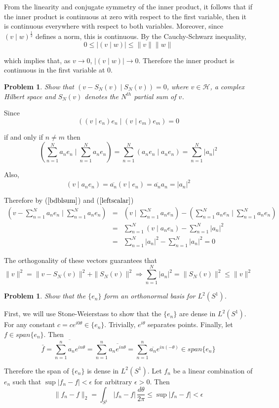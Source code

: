 \documentclass[letterpaper,11pt]{article}
\newtheorem{problem}[theorem]{Problem}
\newcommand{\ip}[2]{\left(#1\mid#2\right)}
\begin{document}
From the linearity and conjugate symmetry of the inner product, it follows that if the inner product is continuous at zero with respect to the first variable, then it is continuous everywhere with respect to both variables.  Moreover, since $\ip{v}{w}^{\frac{1}{2}}$ defines a norm, this is continuous.  By the Cauchy-Schwarz inequality,
\[
0 \leq |\ip{v}{w}| \leq \|v\|\|w\|
\]

which implies that, as $v \rightarrow 0$, $|\ip{v}{w}| \rightarrow 0$.  Therefore the inner product is continuous in the first variable at $0$.

\begin{problem}
Show that $\ip{v - S_N(v)}{S_N(v)} = 0$, where $v \in \mathcal{H}$, a complex Hilbert space and $S_N(v)$ denotes the $N^{th}$ partial sum of $v$.
\end{problem}

Since
\[
\ip{\ip{v}{e_n} e_n}{\ip{v}{e_m} e_m} = 0
\]

if and only if $n \neq m$ then
\begin{equation}
\label{bdblsum}
\ip{\sum_{n=1}^N a_n e_n}{\sum_{n=1}^N a_n e_n} = \sum_{n=1}^N \ip{a_n e_n}{a_n e_n} = \sum_{n=1}^N |a_n|^2
\end{equation}

Also,
\begin{equation}
\label{leftscalar}
\ip{v}{a_n e_n} = \overline{a_n} \ip{v}{e_n} = \overline{a_n} a_n = |a_n|^2
\end{equation}

Therefore by ($\ref{bdblsum}$) and ($\ref{leftscalar}$)
\begin{eqnarray*}
\ip{v - \sum_{n=1}^N a_n e_n}{\sum_{n=1}^N a_n e_n} &=& \ip{v}{\sum_{n=1}^N a_n e_n} - \ip{\sum_{n=1}^N a_n e_n}{\sum_{n=1}^N a_n e_n} \\
&=& \sum_{n=1}^N \ip{v}{a_n e_n} - \sum_{n=1}^N |a_n|^2 \\
&=& \sum_{n=1}^N |a_n|^2 - \sum_{n=1}^N |a_n|^2 = 0
\end{eqnarray*}

The orthogonality of these vectors guarantees that
\[
\|v\|^2 = \|v - S_N(v)\|^2 + \|S_N(v)\|^2 \Rightarrow \sum_{n=1}^N |a_n|^2 = \|S_N(v)\|^2  \leq \|v\|^2
\]

\begin{problem}
Show that the $\{e_n\}$ form an orthonormal basis for $L^2(S^1)$.
\end{problem}

First, we will use Stone-Weierstass to show that the $\{e_n\}$ are dense in $L^2(S^1)$.  For any constant $c = ce^{i0\theta} \in \{e_n\}$.  Trivially, $e^{i\theta}$ separates points.  Finally, let $f \in span\{e_n\}$.  Then
\[
\bar{f} = \overline{\sum_{n=1}^n a_n e^{in\theta}} = \sum_{n=1}^n \overline{a_n e^{in\theta}} = \sum_{n=1}^n \overline{a_n} e^{in(-\theta)} \in span\{e_n\}
\]

Therefore the span of $\{e_n\}$ is dense in $L^2(S^1)$.  Let $f_n$ be a linear combination of $e_n$ such that $\sup|f_n - f| < \epsilon$ for arbitrary $\epsilon > 0$.  Then
\[
\|f_n - f\|_2 = \int_{S^1} |f_n - f| \,\frac{d\theta}{2\pi} \leq \sup |f_n - f| < \epsilon
\]
\end{document}
